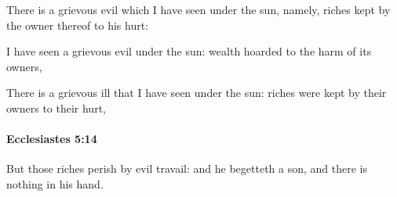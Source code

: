 			\begin{versebox}
					\item[BHS] 
					\item[LXX] 
					\item[ASV] There is a grievous evil which I have seen under the sun, namely, riches kept by the owner thereof to his hurt:
					\item[NIV] I have seen a grievous evil under the sun: wealth hoarded to the harm of its owners,
					\item[NRSV] There is a grievous ill that I have seen under the sun: riches were kept by their owners to their hurt,
			\end{versebox}

		\paragraph{Ecclesiastes 5:14} %
			\label{ECCLESIASTES-5-14}

			But those riches perish by evil travail: and he begetteth a son, and there is nothing in his hand.

